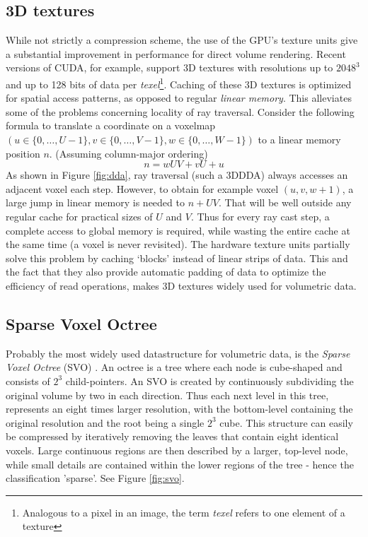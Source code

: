 \subsection{3D textures}
%
While not strictly a compression scheme, the use of the GPU's texture units give a substantial improvement in performance for direct volume rendering. Recent versions of CUDA, for example, support 3D textures with resolutions up to $2048^{3}$ and up to 128 bits of data per \emph{texel}\footnote{Analogous to a pixel in an image, the term \emph{texel} refers to one element of a texture}. Caching of these 3D textures is optimized for spatial access patterns, as opposed to regular \emph{linear memory}. This alleviates some of the problems concerning locality of ray traversal. Consider the following formula to translate a coordinate on a voxelmap $(u \in \{0,\dotsc,U-1\},v \in \{0,\dotsc,V-1\},w \in \{0,\dotsc,W-1\})$ to a linear memory position $n$. (Assuming column-major ordering)
$$
    n = w U V + v  U  + u
$$
As shown in Figure \ref{fig:dda}, ray traversal (such a 3DDDA) always accesses an adjacent voxel each step. However, to obtain for example voxel $(u,v,w+1)$, a large jump in linear memory is needed to $n+UV$.  That will be well outside any regular cache for practical sizes of $U$ and $V$. Thus for every ray cast step, a complete access to global memory is required, while wasting the entire cache at the same time (a voxel is never revisited). The hardware texture units partially solve this problem by caching `blocks' instead of linear strips of data. This and the fact that they also provide automatic padding of data to optimize the efficiency of read operations, makes 3D textures widely used for volumetric data.
\subsection{Sparse Voxel Octree}
%
Probably the most widely used datastructure for volumetric data, is the \emph{Sparse Voxel Octree} (SVO) \cite{efficientsvo10}. An octree is a tree where each node is cube-shaped and consists of $2^{3}$ child-pointers. An SVO is created by continuously subdividing the original volume by two in each direction. Thus each next level in this tree, represents an eight times larger resolution, with the bottom-level containing the original resolution and the root being a single $2^{3}$ cube. This structure can easily be compressed by iteratively removing the leaves that contain eight identical voxels. Large continuous regions are then described by a larger, top-level node, while small details are contained within the lower regions of the tree - hence the classification 'sparse'. See Figure \ref{fig:svo}.

